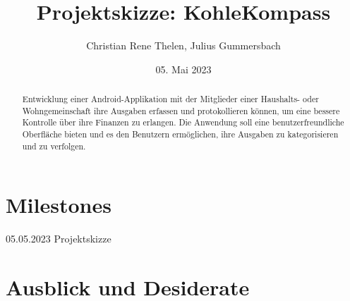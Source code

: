 


\title{Projektskizze: KohleKompass}
\date{05. Mai 2023}
\author{Christian Rene Thelen, Julius Gummersbach}



\maketitle

\begin{abstract}
Entwicklung einer Android-Applikation mit der Mitglieder einer Haushalts- oder Wohngemeinschaft ihre Ausgaben erfassen und protokollieren können, um eine bessere Kontrolle über ihre Finanzen zu erlangen. Die Anwendung soll eine benutzerfreundliche Oberfläche bieten und es den Benutzern ermöglichen, ihre Ausgaben zu kategorisieren und zu verfolgen.
\end{abstract}

\section{Milestones}

05.05.2023 Projektskizze

\section{Ausblick und Desiderate}


